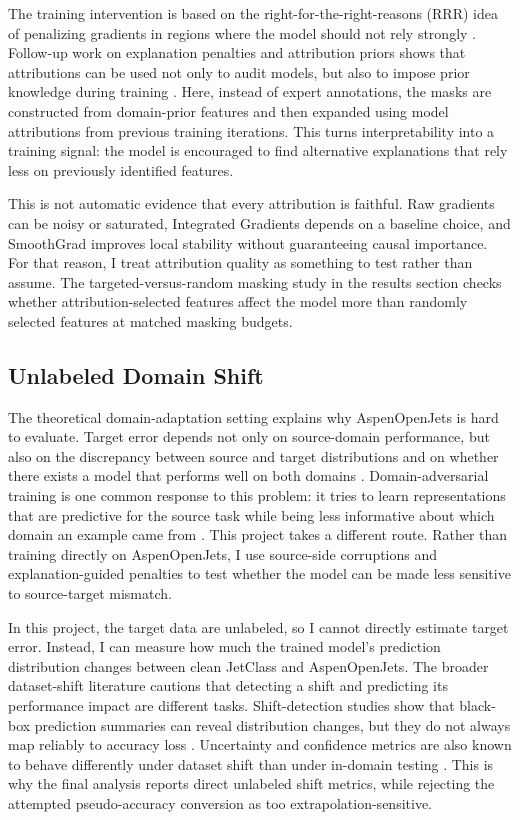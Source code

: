 \documentclass[11pt]{article}
\begin{document}
The training intervention is based on the right-for-the-right-reasons (RRR) idea of penalizing gradients in regions where the model should not rely strongly \cite{ross2017right}. Follow-up work on explanation penalties and attribution priors shows that attributions can be used not only to audit models, but also to impose prior knowledge during training \cite{rieger2020interpretations,erion2021improving}. Here, instead of expert annotations, the masks are constructed from domain-prior features and then expanded using model attributions from previous training iterations. This turns interpretability into a training signal: the model is encouraged to find alternative explanations that rely less on previously identified features.

This is not automatic evidence that every attribution is faithful. Raw gradients can be noisy or saturated, Integrated Gradients depends on a baseline choice, and SmoothGrad improves local stability without guaranteeing causal importance. For that reason, I treat attribution quality as something to test rather than assume. The targeted-versus-random masking study in the results section checks whether attribution-selected features affect the model more than randomly selected features at matched masking budgets.

\subsection{Unlabeled Domain Shift}

The theoretical domain-adaptation setting explains why AspenOpenJets is hard to evaluate. Target error depends not only on source-domain performance, but also on the discrepancy between source and target distributions and on whether there exists a model that performs well on both domains \cite{bendavid2010theory}. Domain-adversarial training is one common response to this problem: it tries to learn representations that are predictive for the source task while being less informative about which domain an example came from \cite{ganin2015unsupervised}. This project takes a different route. Rather than training directly on AspenOpenJets, I use source-side corruptions and explanation-guided penalties to test whether the model can be made less sensitive to source-target mismatch.

In this project, the target data are unlabeled, so I cannot directly estimate target error. Instead, I can measure how much the trained model's prediction distribution changes between clean JetClass and AspenOpenJets. The broader dataset-shift literature cautions that detecting a shift and predicting its performance impact are different tasks. Shift-detection studies show that black-box prediction summaries can reveal distribution changes, but they do not always map reliably to accuracy loss \cite{rabanser2019failing,guillory2021predicting}. Uncertainty and confidence metrics are also known to behave differently under dataset shift than under in-domain testing \cite{ovadia2019trust}. This is why the final analysis reports direct unlabeled shift metrics, while rejecting the attempted pseudo-accuracy conversion as too extrapolation-sensitive.
\end{document}
